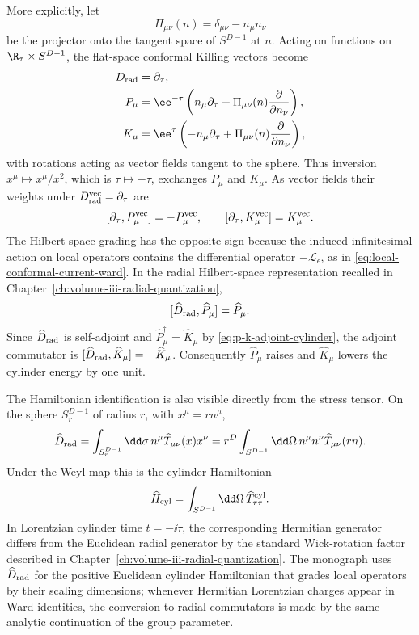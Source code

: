 More explicitly, let
\[
  \Pi_{\mu\nu}(n)=\delta_{\mu\nu}-n_\mu n_\nu
\]
be the projector onto the tangent space of \(S^{D-1}\) at \(n\).  Acting on
functions on \(\R_\tau\times S^{D-1}\), the flat-space conformal Killing
vectors become
\begin{align}
  D_{\rm rad}
  &=
  \partial_\tau,
  \\
  P_\mu
  &=
  \ee^{-\tau}\left(n_\mu\partial_\tau
  +\Pi_{\mu\nu}(n)\frac{\partial}{\partial n_\nu}\right),
  \\
  K_\mu
  &=
  \ee^\tau\left(-n_\mu\partial_\tau
  +\Pi_{\mu\nu}(n)\frac{\partial}{\partial n_\nu}\right),
  \label{eq:pk-cylinder-vector-fields}
\end{align}
with rotations acting as vector fields tangent to the sphere.  Thus inversion
\(x^\mu\mapsto x^\mu/x^2\), which is \(\tau\mapsto-\tau\), exchanges
\(P_\mu\) and \(K_\mu\).  As vector fields their weights under
\(D_{\rm rad}^{\rm vec}=\partial_\tau\) are
\[
  [\partial_\tau,P_\mu^{\rm vec}]=-P_\mu^{\rm vec},
  \qquad
  [\partial_\tau,K_\mu^{\rm vec}]=K_\mu^{\rm vec}.
\]
The Hilbert-space grading has the opposite sign because the induced
infinitesimal action on local operators contains the differential operator
\(-\mathcal L_\epsilon\), as in \eqref{eq:local-conformal-current-ward}.  In
the radial Hilbert-space representation recalled in
Chapter~\ref{ch:volume-iii-radial-quantization},
\[
  [\widehat D_{\rm rad},\widehat P_\mu]=\widehat P_\mu .
\]
Since \(\widehat D_{\rm rad}\) is self-adjoint and
\(\widehat P_\mu^\dagger=\widehat K_\mu\) by
\eqref{eq:p-k-adjoint-cylinder}, the adjoint commutator is
\([\widehat D_{\rm rad},\widehat K_\mu]=-\widehat K_\mu\).
Consequently \(\widehat P_\mu\) raises and \(\widehat K_\mu\) lowers the
cylinder energy by one unit.

The Hamiltonian identification is also visible directly from the stress
tensor.  On the sphere \(S^{D-1}_r\) of radius \(r\), with \(x^\mu=rn^\mu\),
\begin{equation}
  \widehat D_{\rm rad}
  =
  \int_{S^{D-1}_r}\dd\sigma\,n^\mu \widehat T_{\mu\nu}(x)x^\nu
  =
  r^D\int_{S^{D-1}}\dd\Omega\,
  n^\mu n^\nu \widehat T_{\mu\nu}(rn).
  \label{eq:dilatation-charge-stress-tensor-sphere}
\end{equation}
Under the Weyl map this is the cylinder Hamiltonian
\[
  \widehat H_{\rm cyl}
  =
  \int_{S^{D-1}}\dd\Omega\,\widehat T_{\tau\tau}^{\rm cyl}.
\]
In Lorentzian cylinder time \(t=-\ii\tau\), the corresponding Hermitian
generator differs from the Euclidean radial generator by the standard
Wick-rotation factor described in
Chapter~\ref{ch:volume-iii-radial-quantization}.  The monograph uses
\(\widehat D_{\rm rad}\) for the positive Euclidean cylinder Hamiltonian that
grades local operators by their scaling dimensions; whenever Hermitian
Lorentzian charges appear in Ward identities, the conversion to radial
commutators is made by the same analytic continuation of the group parameter.

